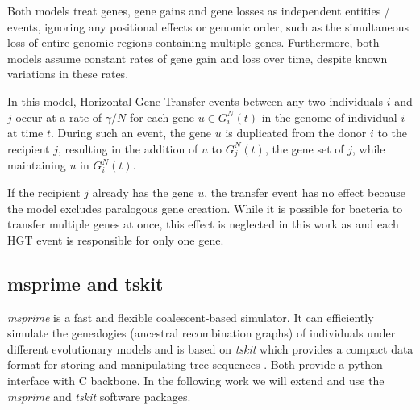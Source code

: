 Both models treat genes, gene gains and gene losses as independent entities / events, ignoring any positional effects or genomic order, such as the simultaneous loss of entire genomic regions containing multiple genes.
Furthermore, both models assume constant rates of gene gain and loss over time, despite known variations in these rates.

In this model, Horizontal Gene Transfer events between any two individuals $i$ and $j$ occur at a rate of $\gamma / N$ for each gene $u \in G^N_i(t)$ in the genome of individual $i$ at time $t$.
During such an event, the gene $u$ is duplicated from the donor $i$ to the recipient $j$, resulting in the addition of $u$ to $G^N_j(t)$, the gene set of $j$, while maintaining $u$ in $G^N_i(t)$.

If the recipient $j$ already has the gene $u$, the transfer event has no effect because the model excludes paralogous gene creation.
While it is possible for bacteria to transfer multiple genes at once, this effect is neglected in this work as and each \ac{HGT} event is responsible for only one gene.

\subsection{msprime and tskit}
\textit{msprime} is a fast and flexible coalescent-based simulator.
It can efficiently simulate the genealogies (ancestral recombination graphs) of individuals under different evolutionary models and
is based on \textit{tskit} which provides a compact data format for storing and manipulating tree sequences \cite{Msprime_Kelleher_2016} \cite{Msprime_Baumdicker_2022}.
Both provide a python interface with C backbone.
In the following work we will extend and use the \textit{msprime} and \textit{tskit} software packages.


